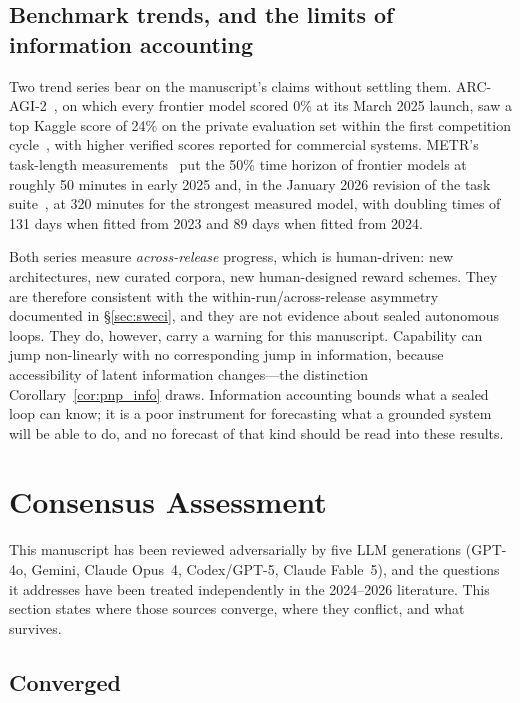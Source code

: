 \documentclass[11pt,a4paper]{article}
\begin{document}
\subsection{Benchmark trends, and the limits of information accounting}

Two trend series bear on the manuscript's claims without settling them. ARC-AGI-2~\cite{chollet2025arcagi2}, on which every frontier model scored 0\% at its March 2025 launch, saw a top Kaggle score of 24\% on the private evaluation set within the first competition cycle~\cite{arcprize2025}, with higher verified scores reported for commercial systems. METR's task-length measurements~\cite{kwa2025horizons} put the 50\% time horizon of frontier models at roughly 50 minutes in early 2025 and, in the January 2026 revision of the task suite~\cite{metr2026horizon}, at 320 minutes for the strongest measured model, with doubling times of 131 days when fitted from 2023 and 89 days when fitted from 2024.

Both series measure \emph{across-release} progress, which is human-driven: new architectures, new curated corpora, new human-designed reward schemes. They are therefore consistent with the within-run/across-release asymmetry documented in \S\ref{sec:sweci}, and they are not evidence about sealed autonomous loops. They do, however, carry a warning for this manuscript. Capability can jump non-linearly with no corresponding jump in information, because accessibility of latent information changes---the distinction Corollary~\ref{cor:pnp_info} draws. Information accounting bounds what a sealed loop can know; it is a poor instrument for forecasting what a grounded system will be able to do, and no forecast of that kind should be read into these results.

\section{Consensus Assessment}
\label{sec:consensus}

This manuscript has been reviewed adversarially by five LLM generations (GPT-4o, Gemini, Claude Opus~4, Codex/GPT-5, Claude Fable~5), and the questions it addresses have been treated independently in the 2024--2026 literature. This section states where those sources converge, where they conflict, and what survives.

\subsection{Converged}
\end{document}
